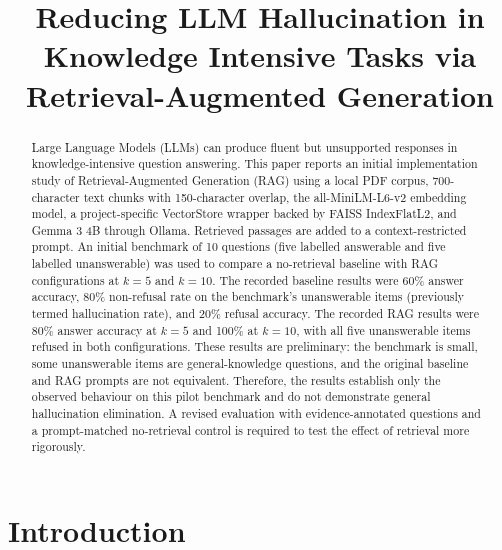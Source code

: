 \documentclass[conference]{IEEEtran}
\begin{document}
\title{Reducing LLM Hallucination in Knowledge Intensive Tasks via Retrieval-Augmented Generation
}

\author{

}

\maketitle

\begin{abstract}
Large Language Models (LLMs) can produce fluent but unsupported responses in knowledge-intensive question answering. This paper reports an initial implementation study of Retrieval-Augmented Generation (RAG) using a local PDF corpus, 700-character text chunks with 150-character overlap, the all-MiniLM-L6-v2 embedding model, a project-specific VectorStore wrapper backed by FAISS IndexFlatL2, and Gemma 3 4B through Ollama. Retrieved passages are added to a context-restricted prompt. An initial benchmark of 10 questions (five labelled answerable and five labelled unanswerable) was used to compare a no-retrieval baseline with RAG configurations at $k=5$ and $k=10$. The recorded baseline results were 60\% answer accuracy, 80\% non-refusal rate on the benchmark's unanswerable items (previously termed hallucination rate), and 20\% refusal accuracy. The recorded RAG results were 80\% answer accuracy at $k=5$ and 100\% at $k=10$, with all five unanswerable items refused in both configurations. These results are preliminary: the benchmark is small, some unanswerable items are general-knowledge questions, and the original baseline and RAG prompts are not equivalent. Therefore, the results establish only the observed behaviour on this pilot benchmark and do not demonstrate general hallucination elimination. A revised evaluation with evidence-annotated questions and a prompt-matched no-retrieval control is required to test the effect of retrieval more rigorously.
\end{abstract}

\section{Introduction}
\end{document}
